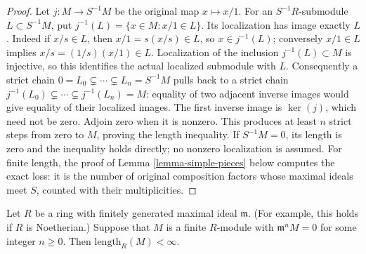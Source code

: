 \begin{proof}
Let $j:M\to S^{-1}M$ be the original map $x\mapsto x/1$.
For an $S^{-1}R$-submodule $L\subset S^{-1}M$, put
$j^{-1}(L)=\{x\in M:x/1\in L\}$. Its localization has image
exactly $L$. Indeed if $x/s\in L$, then $x/1=s(x/s)\in L$,
so $x\in j^{-1}(L)$; conversely $x/1\in L$ implies
$x/s=(1/s)(x/1)\in L$. Localization of the inclusion
$j^{-1}(L)\subset M$ is injective, so this identifies the actual
localized submodule with $L$.
Consequently a strict chain $0=L_0\subsetneq\cdots\subsetneq
L_n=S^{-1}M$ pulls back to a strict chain
$j^{-1}(L_0)\subsetneq\cdots\subsetneq j^{-1}(L_n)=M$:
equality of two adjacent inverse images would give equality of
their localized images. The first inverse image is $\ker(j)$,
which need not be zero. Adjoin zero when it is nonzero. This
produces at least $n$ strict steps from zero to $M$, proving
the length inequality. If $S^{-1}M=0$, its length is zero and
the inequality holds directly; no nonzero localization is assumed.
For finite length, the proof of Lemma \ref{lemma-simple-pieces}
below computes the exact loss: it is the number of original
composition factors whose maximal ideals meet $S$, counted
with their multiplicities.
\end{proof}

\begin{lemma}
\label{lemma-length-finite}
Let $R$ be a ring with finitely generated
maximal ideal $\mathfrak m$. (For example, this holds if $R$ is Noetherian.)
Suppose that $M$ is a finite $R$-module with
$\mathfrak m^n M  =  0$ for some integer $n\geq0$.
Then $\text{length}_R(M) < \infty$.
\end{lemma}

